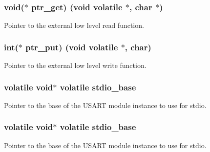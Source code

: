 \subsubsection[{ptr\+\_\+get}]{\setlength{\rightskip}{0pt plus 5cm}void($\ast$ ptr\+\_\+get) (void volatile $\ast$, char $\ast$)}\label{group__group__common__utils__stdio_ga7332be07af3c0ab09d41a9b0b97efbe8}
Pointer to the external low level read function. \hypertarget{group__group__common__utils__stdio_gab88750c764f1e24b95134201373aba70}{}
\subsubsection[{ptr\+\_\+put}]{\setlength{\rightskip}{0pt plus 5cm}int($\ast$ ptr\+\_\+put) (void volatile $\ast$, char)}\label{group__group__common__utils__stdio_gab88750c764f1e24b95134201373aba70}
Pointer to the external low level write function. \hypertarget{group__group__common__utils__stdio_gad4163ee0eaa09db3b42c367fd768e737}{}
\subsubsection[{stdio\+\_\+base}]{\setlength{\rightskip}{0pt plus 5cm}volatile void$\ast$ volatile stdio\+\_\+base}\label{group__group__common__utils__stdio_gad4163ee0eaa09db3b42c367fd768e737}
Pointer to the base of the U\+S\+A\+R\+T module instance to use for stdio. \hypertarget{group__group__common__utils__stdio_gad4163ee0eaa09db3b42c367fd768e737}{}
\subsubsection[{stdio\+\_\+base}]{\setlength{\rightskip}{0pt plus 5cm}volatile void$\ast$ volatile stdio\+\_\+base}\label{group__group__common__utils__stdio_gad4163ee0eaa09db3b42c367fd768e737}
Pointer to the base of the U\+S\+A\+R\+T module instance to use for stdio. 